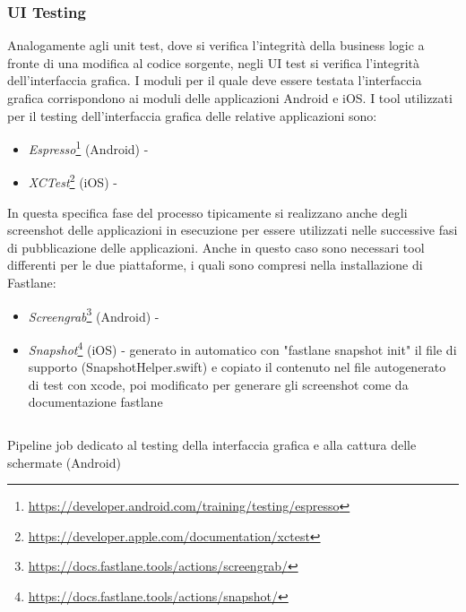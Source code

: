 \subsubsection{UI Testing}
Analogamente agli unit test, dove si verifica l'integrità della business logic a fronte di una modifica al codice sorgente, negli UI test si verifica l'integrità dell'interfaccia grafica. I moduli per il quale deve essere testata l'interfaccia grafica corrispondono ai moduli delle applicazioni Android e iOS. I tool utilizzati per il testing dell'interfaccia grafica delle relative applicazioni sono:
\begin{itemize}
    \item \textit{Espresso}\footnote{\url{https://developer.android.com/training/testing/espresso}} (Android) -
    \item \textit{XCTest}\footnote{\url{https://developer.apple.com/documentation/xctest}} (iOS) - 
\end{itemize}
In questa specifica fase del processo tipicamente si realizzano anche degli screenshot delle applicazioni in esecuzione per essere utilizzati nelle successive fasi di pubblicazione delle applicazioni. Anche in questo caso sono necessari tool differenti per le due piattaforme, i quali sono compresi nella installazione di Fastlane:
\begin{itemize}
    \item \textit{Screengrab}\footnote{\url{https://docs.fastlane.tools/actions/screengrab/}} (Android) -
    \item \textit{Snapshot}\footnote{\url{https://docs.fastlane.tools/actions/snapshot/}} (iOS) - generato in automatico con "fastlane snapshot init" il file di supporto (SnapshotHelper.swift) e copiato il contenuto nel file autogenerato di test con xcode, poi modificato per generare gli screenshot come da documentazione fastlane
\end{itemize}

\begin{listing}[H]
\inputminted{yaml}{code/4-screenshot-ui-android}
\caption{Pipeline job dedicato al testing della interfaccia grafica e alla cattura delle schermate (Android)}
\end{listing}


